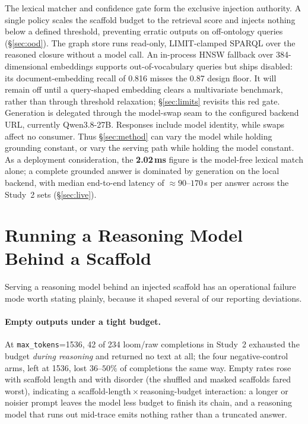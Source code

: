 \documentclass[10pt,twocolumn]{article}
\begin{document}
The lexical matcher and confidence gate form the exclusive injection authority. A single policy scales the scaffold budget to the retrieval score and injects nothing below a defined threshold, preventing erratic outputs on off-ontology queries (\S\ref{sec:ood}). The graph store runs read-only, LIMIT-clamped SPARQL over the reasoned closure without a model call. An in-process HNSW fallback over 384-dimensional embeddings supports out-of-vocabulary queries but ships disabled: its document-embedding recall of 0.816 misses the 0.87 design floor. It will remain off until a query-shaped embedding clears a multivariate benchmark, rather than through threshold relaxation; \S\ref{sec:limits} revisits this red gate. Generation is delegated through the model-swap seam to the configured backend URL, currently Qwen3.8-27B. Responses include model identity, while swaps affect no consumer. Thus \S\ref{sec:method} can vary the model while holding grounding constant, or vary the serving path while holding the model constant. As a deployment consideration, the \textbf{2.02\,ms} figure is the model-free lexical match alone; a complete grounded answer is dominated by generation on the local backend, with median end-to-end latency of $\approx90$--$170$\,s per answer across the Study~2 sets (\S\ref{sec:live}).


\section{Running a Reasoning Model Behind a Scaffold}\label{sec:practitioner}
Serving a reasoning model behind an injected scaffold has an operational failure mode worth stating plainly, because it shaped several of our reporting deviations.

\paragraph{Empty outputs under a tight budget.} At \texttt{max\_tokens}=1536, 42 of 234 loom/raw completions in Study~2 exhausted the budget \emph{during reasoning} and returned no text at all; the four negative-control arms, left at 1536, lost $36$--$50\%$ of completions the same way. Empty rates rose with scaffold length and with disorder (the shuffled and masked scaffolds fared worst), indicating a scaffold-length\,$\times$\,reasoning-budget interaction: a longer or noisier prompt leaves the model less budget to finish its chain, and a reasoning model that runs out mid-trace emits nothing rather than a truncated answer.
\end{document}
